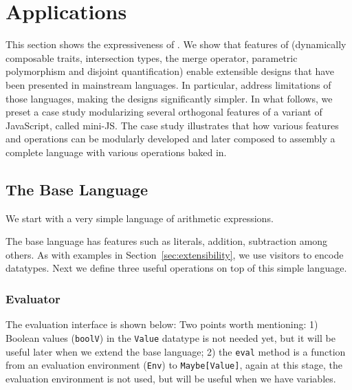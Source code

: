 \section{Applications}



This section shows the expressiveness of \name. We show that features of \name
(dynamically composable traits, intersection types, the merge operator,
parametric polymorphism and disjoint quantification) enable extensible designs
that have been presented in mainstream languages. In particular, \name address
limitations of those languages, making the designs significantly simpler. In
what follows, we preset a case study modularizing several orthogonal features of
a variant of JavaScript, called mini-JS. The case study illustrates that how
various features and operations can be modularly developed and later composed to
assembly a complete language with various operations baked in.

\subsection{The Base Language}

We start with a very simple language of arithmetic expressions.

The base language has features such as literals, addition, subtraction among
others. As with examples in Section~\ref{sec:extensibility}, we use visitors to
encode datatypes. Next we define three useful operations on top of this simple
language.

\subsubsection{Evaluator}

The evaluation interface is shown below:
Two points worth mentioning: 1) Boolean values (\lstinline{boolV}) in the
\lstinline{Value} datatype is not needed yet, but it will be useful later when
we extend the base language; 2) the \lstinline{eval} method is a function from
an evaluation environment (\lstinline{Env}) to \lstinline{Maybe[Value]}, again
at this stage, the evaluation environment is not used, but will be useful when
we have variables.

